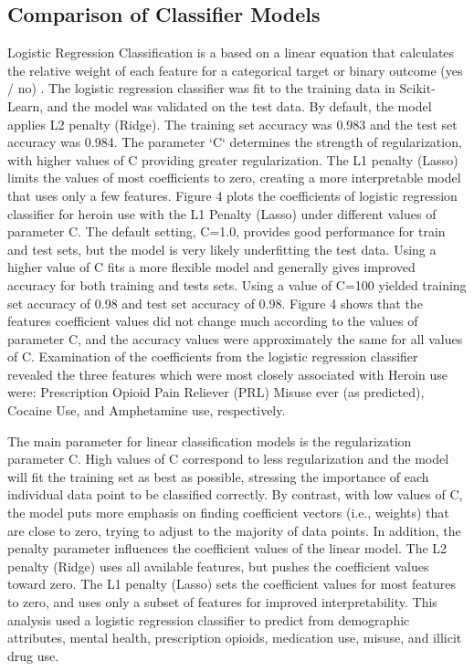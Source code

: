 \documentclass[sigconf]{acmart}
\begin{document}
\subsection{Comparison of Classifier Models}
 
Logistic Regression Classification is a based on a linear equation that 
calculates the relative weight of each feature for a categorical target or 
binary outcome (yes / no) \cite{raschka17}. The logistic regression classifier 
was fit to the training data in Scikit-Learn, and the model was validated on 
the test data. By default, the model applies L2 penalty (Ridge). The training 
set accuracy was 0.983 and the test set accuracy was 0.984. The parameter `C` 
determines the strength of regularization, with higher values of C providing
greater regularization. The L1 penalty (Lasso) limits the values of most 
coefficients to zero, creating a more interpretable model that uses only a 
few features. Figure 4 plots the coefficients of logistic regression classifier 
for heroin use with the L1 Penalty (Lasso) under different values of parameter 
C. The default setting, C=1.0, provides good performance for train and test 
sets, but the model is very likely underfitting the test data. Using a higher
value of C fits a more flexible model and generally gives improved accuracy 
for both training and tests sets. Using a value of C=100 yielded training set
accuracy of 0.98 and test set accuracy of 0.98. Figure 4 shows that the 
features coefficient values did not change much according to the values of
parameter C, and the accuracy values were approximately the same for all 
values of C. Examination of the coefficients from the logistic regression 
classifier revealed the three features which were most closely associated 
with Heroin use were: Prescription Opioid Pain Reliever (PRL) Misuse ever 
(as predicted), Cocaine Use, and Amphetamine use, respectively.

The main parameter for linear classification models is the
regularization parameter C. High values of C correspond to less regularization 
and the model will fit the training set as best as possible, stressing the 
importance of each individual data point to be classified correctly. By 
contrast, with low values of C, the model puts more emphasis on finding 
coefficient vectors (i.e., weights) that are close to zero, trying to adjust to 
the majority of data points. In addition, the penalty parameter influences the 
coefficient values of the linear model. The L2 penalty (Ridge) uses all 
available features, but pushes the coefficient values toward zero. The L1 
penalty (Lasso) sets the coefficient values for most features to zero, and uses 
only a subset of features for improved interpretability. This analysis used a 
logistic regression classifier to predict  from demographic 
attributes, mental health, prescription opioids, medication use, misuse, 
and illicit drug use. 
\end{document}
